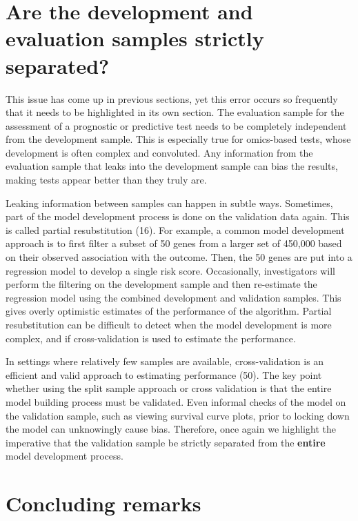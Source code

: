 \documentclass[11pt]{article}
\begin{document}
\section{Are the development and evaluation samples strictly
separated?}\label{are-the-development-and-evaluation-samples-strictly-separated}

This issue has come up in previous sections, yet this error occurs so
frequently that it needs to be highlighted in its own section. The
evaluation sample for the assessment of a prognostic or predictive test
needs to be completely independent from the development sample. This is
especially true for omics-based tests, whose development is often
complex and convoluted. Any information from the evaluation sample that
leaks into the development sample can bias the results, making tests
appear better than they truly are.

Leaking information between samples can happen in subtle ways.
Sometimes, part of the model development process is done on the
validation data again. This is called partial resubstitution (16). For
example, a common model development approach is to first filter a subset
of 50 genes from a larger set of 450,000 based on their observed
association with the outcome. Then, the 50 genes are put into a
regression model to develop a single risk score. Occasionally,
investigators will perform the filtering on the development sample and
then re-estimate the regression model using the combined development and
validation samples. This gives overly optimistic estimates of the
performance of the algorithm. Partial resubstitution can be difficult to
detect when the model development is more complex, and if
cross-validation is used to estimate the performance.

In settings where relatively few samples are available, cross-validation
is an efficient and valid approach to estimating performance (50). The
key point whether using the split sample approach or cross validation is
that the entire model building process must be validated. Even informal
checks of the model on the validation sample, such as viewing survival
curve plots, prior to locking down the model can unknowingly cause bias.
Therefore, once again we highlight the imperative that the validation
sample be strictly separated from the \textbf{entire} model development
process.

\section{Concluding remarks}\label{concluding-remarks}
\end{document}
